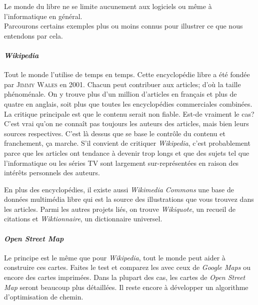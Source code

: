 




\vspace{.6cm}
Le monde du libre ne se limite aucunement aux logiciels ou même à l'informatique en général.\\
Parcourons certains exemples plus ou moins connus pour illustrer ce que nous entendons par cela.

\paragraph{\textit{Wikipedia}}
Tout le monde l'utilise de temps en temps. Cette encyclopédie libre a été fondée par \textsc{Jimmy Wales} en 2001.
Chacun peut contribuer aux articles; d'où la taille phénoménale.
On y trouve plus d'un million d'articles en français et plus de quatre en anglais, soit plus que toutes les encyclopédies commerciales combinées.
La critique principale est que le contenu serait non fiable.
Est-de vraiment le cas? C'est vrai qu'on ne connaît pas toujours les auteurs des articles, mais bien leurs sources respectives.
C'est là dessus que se base le contrôle du contenu et franchement, ça marche.
S'il convient de critiquer \textit{Wikipedia}, c'est probablement parce que les articles ont tendance à devenir trop longs et que des sujets tel que l'informatique ou les séries TV
sont largement sur-représentées en raison des intérêts personnels des auteurs.

En plus des encyclopédies, il existe aussi \textit{Wikimedia Commons} une base de données multimédia libre
qui est la source des illustrations que vous trouvez dans les articles.
Parmi les autres projets liés, on trouve \textit{Wikiquote}, un recueil de citations et \textit{Wiktionnaire}, un dictionnaire universel.

\paragraph{\textit{Open Street Map}}
Le principe est le même que pour \textit{Wikipedia}, tout le monde peut aider à construire ces cartes.
Faites le test et comparez les avec ceux de \textit{Google Maps} ou encore des cartes imprimées.
Dans la plupart des cas, les cartes de \textit{Open Street Map} seront beaucoup plus détaillées.
Il reste encore à développer un algorithme d'optimisation de chemin.


